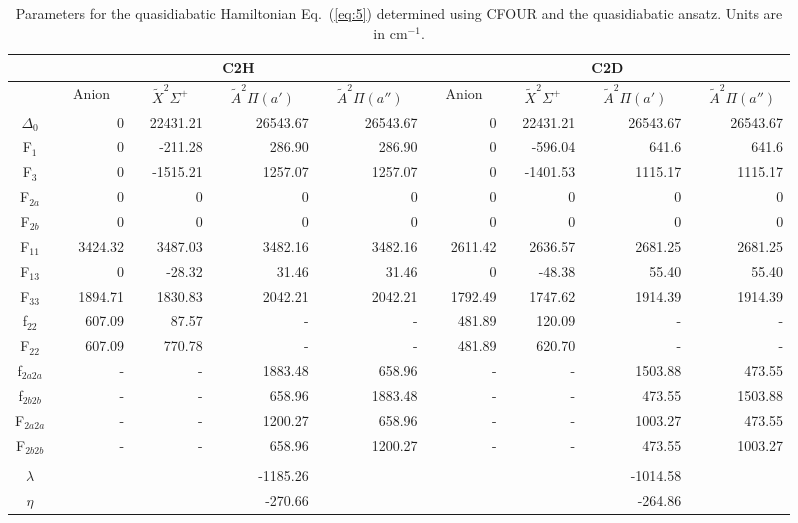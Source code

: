 \documentclass[aip,graphicx]{revtex4-1}
\begin{document}
\begin{table}
	\caption{Parameters for the quasidiabatic Hamiltonian Eq.~(\ref{eq:5}) determined using CFOUR and the quasidiabatic ansatz. Units are in cm$^{-1}$.}
	\label{tab:1}

	\begin{tabular}{c | r r r r | r r r r} 
		\hline
		& \multicolumn{4}{c}{C2H} & \multicolumn{4}{c}{C2D}\\
		\hline
		& ~~Anion~~ & ~~$\tilde{X}^2\Sigma^+$~~ & ~~$\tilde{A}^2\Pi (a')$~~ & ~~$\tilde{A}^2\Pi (a'')$~~ & ~~Anion~~ & ~~$\tilde{X}^2\Sigma^+$~~ & ~~$\tilde{A}^2\Pi (a')$~~ & ~~$\tilde{A}^2\Pi (a'')$~  \\
		\hline
		$\Delta_0$ & 0& 22431.21&  26543.67& 26543.67& 0 & 22431.21& 26543.67& 26543.67 \\
		F$_1$ &  0& -211.28& 286.90& 286.90& 0& -596.04& 641.6& 641.6\\
		F$_3$ &  0& -1515.21&  1257.07& 1257.07& 0& -1401.53& 1115.17& 1115.17\\
		F$_{2a}$& 0 & 0& 0& 0& 0& 0& 0&0 \\
		F$_{2b}$&  0& 0& 0& 0& 0& 0& 0&0 \\
		F$_{11}$& 3424.32 &  3487.03& 3482.16& 3482.16& 2611.42&  2636.57& 2681.25& 2681.25\\
		F$_{13}$&  0 & -28.32& 31.46& 31.46& 0& -48.38& 55.40& 55.40\\
		F$_{33}$& 1894.71 & 1830.83& 2042.21& 2042.21& 1792.49&  1747.62& 1914.39& 1914.39\\
		f$_{22}$& 607.09&  87.57& -& -& 481.89&  120.09& -& -\\
		F$_{22}$& 607.09 & 770.78& -& -& 481.89& 620.70& -& -\\
		f$_{2a2a}$& - &- & 1883.48& 658.96& -& -& 1503.88& 473.55\\
		f$_{2b2b}$& - &- & 658.96& 1883.48& -& -& 473.55& 1503.88\\
		F$_{2a2a}$& -& -& 1200.27& 658.96& -& -& 1003.27& 473.55\\
		F$_{2b2b}$& -& -& 658.96& 1200.27& -& -& 473.55& 1003.27\\
		&&&&&&&& \\
		$\lambda$& & & -1185.26& & & & -1014.58& \\
		$\eta$ & & & -270.66& & & & -264.86& \\
		
	\end{tabular}
\end{table}
\end{document}
